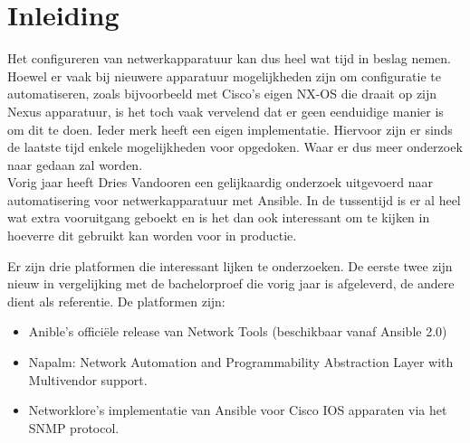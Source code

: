 
\chapter{Inleiding}
\label{ch:inleiding}
Het configureren van netwerkapparatuur kan dus heel wat tijd in beslag nemen. Hoewel er vaak bij nieuwere apparatuur mogelijkheden zijn om configuratie te automatiseren, zoals bijvoorbeeld met Cisco's eigen NX-OS die draait op zijn Nexus apparatuur, is het toch vaak vervelend dat er geen eenduidige manier is om dit te doen. \autocite{ciscoNxosPDF} Ieder merk heeft een eigen implementatie. Hiervoor zijn er sinds de laatste tijd enkele mogelijkheden voor opgedoken. Waar er dus meer onderzoek naar gedaan zal worden.\autocite{Vandooren2015}
\\

Vorig jaar heeft Dries Vandooren een gelijkaardig onderzoek uitgevoerd naar automatisering voor netwerkapparatuur met Ansible. In de tussentijd is er al heel wat extra vooruitgang geboekt en is het dan ook interessant om te kijken in hoeverre dit gebruikt kan worden voor in productie.

Er zijn drie platformen die interessant lijken te onderzoeken. De eerste twee zijn  nieuw in vergelijking met de bachelorproef die vorig jaar is afgeleverd, de andere dient als referentie. De platformen zijn: 
\begin{itemize}
\item Anible's officiële release van Network Tools (beschikbaar vanaf Ansible 2.0)
\item Napalm: Network Automation and Programmability Abstraction Layer with Multivendor support.
\item Networklore's implementatie van Ansible voor Cisco IOS apparaten via het SNMP protocol.
\\
\end{itemize}



